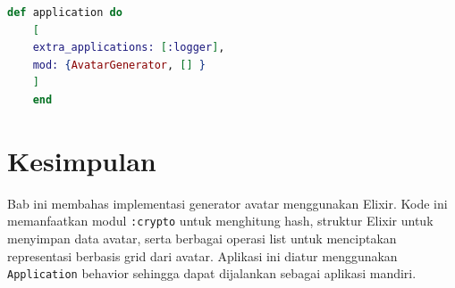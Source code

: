 \begin{lstlisting}[language=Elixir, caption={Menentukan modul awal pada \texttt{mix.exs}}]
	def application do
	[
	extra_applications: [:logger],
	mod: {AvatarGenerator, [] }
	]
	end
\end{lstlisting}

\section{Kesimpulan}
Bab ini membahas implementasi generator avatar menggunakan Elixir. Kode ini memanfaatkan modul \texttt{:crypto} untuk menghitung hash, struktur Elixir untuk menyimpan data avatar, serta berbagai operasi list untuk menciptakan representasi berbasis grid dari avatar. Aplikasi ini diatur menggunakan \texttt{Application} behavior sehingga dapat dijalankan sebagai aplikasi mandiri.
